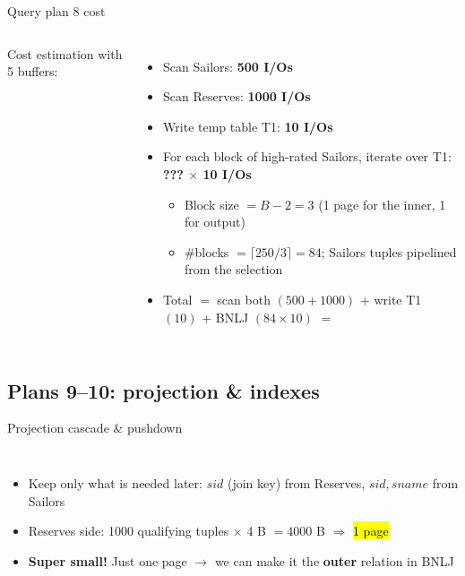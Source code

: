 \begin{frame}{Query plan 8 cost }
  \begin{columns}[c]
      Cost estimation with 5 buffers:
      \begin{itemize}
        \item Scan Sailors: \textbf{500 I/Os}
        \item Scan Reserves: \textbf{1000 I/Os}
        \item Write temp table T1: \textbf{10 I/Os}
        \item For each block of high-rated Sailors, iterate over T1: \textbf{??? $\times$ 10 I/Os}
        \begin{itemize}
          \item Block size $= B - 2 = 3$ (1 page for the inner, 1 for output)
          \item \#blocks $= \lceil 250/3 \rceil = 84$; Sailors tuples pipelined from the selection
        \end{itemize}
        \item Total $=$ scan both $(500 + 1000)$ + write T1 $(10)$ + BNLJ $(84 \times 10)$ $=$ 
      \end{itemize}
      \planbox[hl]{60mm}{\PlanEight}
  \end{columns}
\end{frame}



\subsection{Plans 9--10: projection \& indexes}

\begin{frame}{Projection cascade \& pushdown }
  \begin{columns}[c]
      \begin{itemize}
        :\\
          $[\pi(X)] = \lceil |X| \cdot \text{bytes kept per tuple} \,/\, \text{page size} \rceil$
        \item Keep only what is needed later: $\mathit{sid}$ (join key) from Reserves, $\mathit{sid},\mathit{sname}$ from Sailors
        \item Reserves side: 1000 qualifying tuples $\times$ 4 B $= 4000$ B $\Rightarrow$ \hl{1 page}
        \item \textbf{Super small!} Just one page $\to$ we can make it the \textbf{outer} relation in BNLJ
      \end{itemize}
      \planbox[hl]{62mm}{\PlanEightP}
  \end{columns}
\end{frame}

